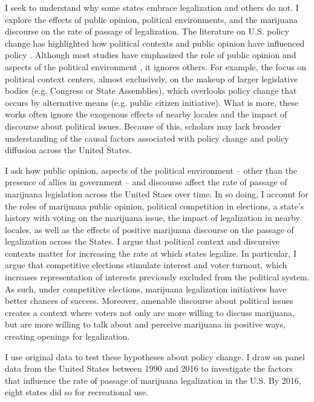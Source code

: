 I seek to understand why some states embrace legalization and others do not. I explore the effects of public opinion, political environments, and the marijuana discourse on the rate of passage of legalization. The literature on U.S. policy change has highlighted how political contexts and public opinion have influenced policy \citep{burstein_and_linton_2002,amenta_et_al_2001,elliott_and_amenta_2019}. Although most studies have emphasized the role of public opinion and aspects of the political environment  \citep{burstein_and_linton_2002}, it ignores others. For example, the focus on political context centers, almost exclusively, on the makeup of larger legislative bodies (e.g. Congress or State Assemblies), which overlooks policy change that occurs by alternative means (e.g. public citizen initiative). What is more, these works often ignore the exogenous effects of nearby locales and the impact of discourse about political issues. Because of this, scholars may lack broader understanding of the causal factors associated with policy change and policy diffusion across the United States. 

I ask how public opinion, aspects of the political environment -- other than the presence of allies in government -- and discourse affect the rate of passage of marijuana legislation across the United Staes over time. In so doing, I account for the roles of marijuana public opinion, political competition in elections, a state's history with voting on the marijuana issue, the impact of legalization in nearby locales, as well as the effects of positive marijuana discourse on the passage of legalization across the States. I argue that political context and discursive contexts matter for increasing the rate at which states legalize. In particular, I argue that competitive elections stimulate interest and voter turnout, which increases representation of interests previously excluded from the political system. As such, under competitive elections, marijuana legalization initiatives have better chances of success. Moreover, amenable discourse about political issues creates a context where voters not only are more willing to discuss marijuana, but are more willing to talk about and perceive marijuana in positive ways, creating openings for legalization. 



I use original data to test these hypotheses about policy change. I draw on panel data from the United States between 1990 and 2016 to investigate the factors that influence the rate of passage of marijuana legalization in the U.S. By 2016, eight states did so for recreational use. %




